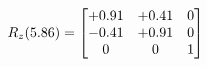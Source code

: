 \documentclass[preview]{standalone}
\begin{document}
\begin{align*}
\special{dvisvgm:raw <g id='unique000'>}R_{z}(5.86) = \begin{bmatrix}+0.91 & +0.41 & 0 \\-0.41 & +0.91 & 0 \\0 & 0 & 1\end{bmatrix}\special{dvisvgm:raw </g>}
\end{align*}
\end{document}
